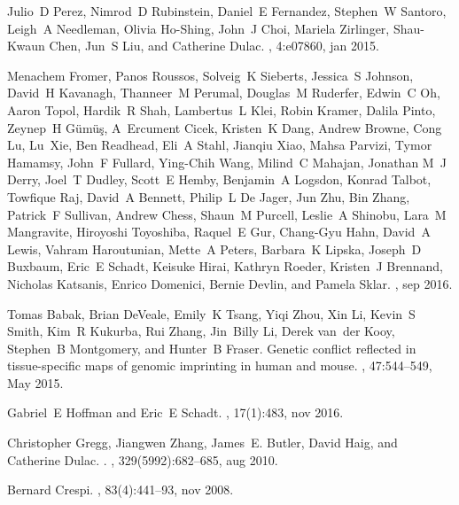 \documentclass[letterpaper]{article}
\begin{document}
\begin{thebibliography}{10}
Julio~D Perez, Nimrod~D Rubinstein, Daniel~E Fernandez, Stephen~W Santoro,
  Leigh~A Needleman, Olivia Ho-Shing, John~J Choi, Mariela Zirlinger,
  Shau-Kwaun Chen, Jun~S Liu, and Catherine Dulac.
, 4:e07860, jan 2015.

Menachem Fromer, Panos Roussos, Solveig~K Sieberts, Jessica~S Johnson, David~H
  Kavanagh, Thanneer~M Perumal, Douglas~M Ruderfer, Edwin~C Oh, Aaron Topol,
  Hardik~R Shah, Lambertus~L Klei, Robin Kramer, Dalila Pinto, Zeynep~H
  G{\"{u}}m{\"{u}}ş, A~Ercument Cicek, Kristen~K Dang, Andrew Browne, Cong Lu,
  Lu~Xie, Ben Readhead, Eli~A Stahl, Jianqiu Xiao, Mahsa Parvizi, Tymor
  Hamamsy, John~F Fullard, Ying-Chih Wang, Milind~C Mahajan, Jonathan M~J
  Derry, Joel~T Dudley, Scott~E Hemby, Benjamin~A Logsdon, Konrad Talbot,
  Towfique Raj, David~A Bennett, Philip~L {De Jager}, Jun Zhu, Bin Zhang,
  Patrick~F Sullivan, Andrew Chess, Shaun~M Purcell, Leslie~A Shinobu, Lara~M
  Mangravite, Hiroyoshi Toyoshiba, Raquel~E Gur, Chang-Gyu Hahn, David~A Lewis,
  Vahram Haroutunian, Mette~A Peters, Barbara~K Lipska, Joseph~D Buxbaum,
  Eric~E Schadt, Keisuke Hirai, Kathryn Roeder, Kristen~J Brennand, Nicholas
  Katsanis, Enrico Domenici, Bernie Devlin, and Pamela Sklar.
, sep 2016.

Tomas Babak, Brian DeVeale, Emily~K Tsang, Yiqi Zhou, Xin Li, Kevin~S Smith,
  Kim~R Kukurba, Rui Zhang, Jin~Billy Li, Derek van~der Kooy, Stephen~B
  Montgomery, and Hunter~B Fraser.
\newblock Genetic conflict reflected in tissue-specific maps of genomic
  imprinting in human and mouse.
, 47:544--549, May 2015.

Gabriel~E Hoffman and Eric~E Schadt.
, 17(1):483, nov 2016.

Christopher Gregg, Jiangwen Zhang, James~E. Butler, David Haig, and Catherine
  Dulac.
.
, 329(5992):682--685, aug 2010.

Bernard Crespi.
,
  83(4):441--93, nov 2008.


\end{thebibliography}
\end{document}
